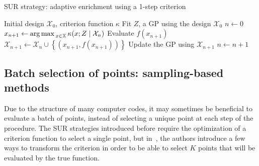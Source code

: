 \documentclass[../../Main_ManuscritThese.tex]{subfiles}
\begin{document}
\begin{algorithm}
  \caption{\label{alg:SUR_strat} SUR strategy: adaptive enrichment using a 1-step criterion}
\begin{algorithmic}
\REQUIRE Initial design $\mathcal{X}_0$, criterion function $\kappa$
\STATE Fit $Z$, a GP using the design $\mathcal{X}_0$
\STATE $n \leftarrow 0$
\STATE $x_{n+1} \leftarrow \operatorname*{arg\,max \,}_{x \in \mathbb{X}} \kappa(x; Z \mid \mathcal{X}_{n})$
\STATE Evaluate $f(x_{n+1})$
\STATE $\mathcal{X}_{n+1} \leftarrow \mathcal{X}_n \cup \left\{\left(x_{n+1}, f(x_{n+1})\right)\right\}$
\STATE Update the GP using $\mathcal{X}_{n+1}$
\STATE $n \leftarrow n + 1$
\ENDWHILE
\end{algorithmic}
\end{algorithm}


\subsection{Batch selection of points: sampling-based methods}
\label{sec:sampling_based_criterion}

Due to the structure of many computer codes, it may sometimes be
beneficial to evaluate a batch of points, instead of selecting a
unique point at each step of the procedure. The SUR strategies
introduced before require the optimization of a criterion function to
select a single point, but in~\cite{ginsbourger_kriging_2010}, the
authors introduce a few ways to transform the criterion in order to be
able to select $K$ points that will be evaluated by the true function.
\end{document}
